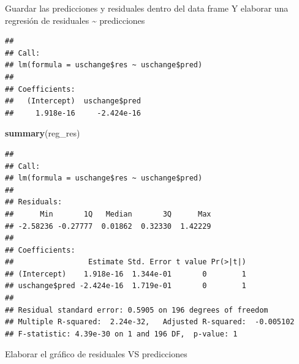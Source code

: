 \documentclass[
]{article}
\newenvironment{Shaded}{\begin{snugshade}}{\end{snugshade}}
\newcommand{\CommentTok}[1]{\textcolor[rgb]{0.56,0.35,0.01}{\textit{#1}}}
\newcommand{\FunctionTok}[1]{\textcolor[rgb]{0.13,0.29,0.53}{\textbf{#1}}}
\newcommand{\NormalTok}[1]{#1}
\newcommand{\OtherTok}[1]{\textcolor[rgb]{0.56,0.35,0.01}{#1}}
\newcommand{\SpecialCharTok}[1]{\textcolor[rgb]{0.81,0.36,0.00}{\textbf{#1}}}
\begin{document}

Guardar las predicciones y residuales dentro del data frame Y elaborar
una regresión de residuales \textasciitilde{} predicciones

\begin{Shaded}
\end{Shaded}

\begin{verbatim}
## 
## Call:
## lm(formula = uschange$res ~ uschange$pred)
## 
## Coefficients:
##   (Intercept)  uschange$pred  
##     1.918e-16     -2.424e-16
\end{verbatim}

\begin{Shaded}
\begin{Highlighting}[]
\FunctionTok{summary}\NormalTok{(reg\_res)}
\end{Highlighting}
\end{Shaded}

\begin{verbatim}
## 
## Call:
## lm(formula = uschange$res ~ uschange$pred)
## 
## Residuals:
##      Min       1Q   Median       3Q      Max 
## -2.58236 -0.27777  0.01862  0.32330  1.42229 
## 
## Coefficients:
##                 Estimate Std. Error t value Pr(>|t|)
## (Intercept)    1.918e-16  1.344e-01       0        1
## uschange$pred -2.424e-16  1.719e-01       0        1
## 
## Residual standard error: 0.5905 on 196 degrees of freedom
## Multiple R-squared:  2.24e-32,   Adjusted R-squared:  -0.005102 
## F-statistic: 4.39e-30 on 1 and 196 DF,  p-value: 1
\end{verbatim}

Elaborar el gráfico de residuales VS predicciones
\end{document}
